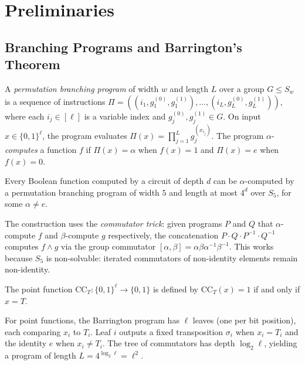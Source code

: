 \documentclass[version=submission]{iacrcc}
\newcommand{\CC}{\mathrm{CC}}
\begin{document}
\section{Preliminaries}
\label{sec:prelim}

\subsection{Branching Programs and Barrington's Theorem}

\begin{definition}
A \emph{permutation branching program} of width $w$ and length $L$ over a group
$G \leq S_w$ is a sequence of instructions
$\Pi = ((i_1, g_1^{(0)}, g_1^{(1)}), \ldots, (i_L, g_L^{(0)}, g_L^{(1)}))$,
where each $i_j \in [\ell]$ is a variable index and $g_j^{(0)}, g_j^{(1)} \in G$.
On input $x \in \{0,1\}^\ell$, the program evaluates
$\Pi(x) = \prod_{j=1}^{L} g_j^{(x_{i_j})}$.
The program $\alpha$-\emph{computes} a function $f$ if $\Pi(x) = \alpha$ when
$f(x) = 1$ and $\Pi(x) = e$ when $f(x) = 0$.
\end{definition}

\begin{theorem}
\label{thm:barrington}
Every Boolean function computed by a circuit of depth $d$ can be
$\alpha$-computed by a permutation branching program of width $5$ and
length at most $4^d$ over $S_5$, for some $\alpha \neq e$.
\end{theorem}

The construction uses the \emph{commutator trick}: given programs $P$ and $Q$
that $\alpha$-compute $f$ and $\beta$-compute $g$ respectively, the concatenation
$P \cdot Q \cdot P^{-1} \cdot Q^{-1}$ computes $f \wedge g$ via the group
commutator $[\alpha, \beta] = \alpha\beta\alpha^{-1}\beta^{-1}$. This works because
$S_5$ is non-solvable: iterated commutators of non-identity elements remain
non-identity.

\begin{definition}
The point function $\CC_T : \{0,1\}^\ell \to \{0,1\}$ is defined by
$\CC_T(x) = 1$ if and only if $x = T$.
\end{definition}

For point functions, the Barrington program has $\ell$ leaves (one per bit position),
each comparing $x_i$ to $T_i$. Leaf $i$ outputs a fixed transposition $\sigma_i$
when $x_i = T_i$ and the identity $e$ when $x_i \neq T_i$. The tree of
commutators has depth $\log_2 \ell$, yielding a program of length $L = 4^{\log_2 \ell}
= \ell^2$.
\end{document}
